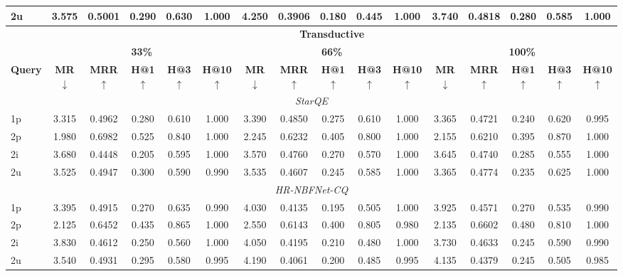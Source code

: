 \documentclass[10pt,journal,compsoc]{IEEEtran}
\begin{document}
\begin{table}[t]
{\begin{tabular}{l ccccc ccccc ccccc}
2u & 3.575 & 0.5001 & 0.290 & 0.630 & 1.000 & 4.250 & 0.3906 & 0.180 & 0.445 & 1.000 & 3.740 & 0.4818 & 0.280 & 0.585 & 1.000 \\
\midrule\midrule
 & \multicolumn{15}{c}{\textbf{Transductive}} \\ \toprule
 & \multicolumn{5}{c}{\textbf{33\%}} & \multicolumn{5}{c}{\textbf{66\%}} & \multicolumn{5}{c}{\textbf{100\%}} \\
\cmidrule(lr){2-6} \cmidrule(lr){7-11} \cmidrule(lr){12-16}
\textbf{Query}
  & \textbf{MR} $\downarrow$& \textbf{MRR} $\uparrow$& \textbf{H@1} $\uparrow$& \textbf{H@3} $\uparrow$& \textbf{H@10} $\uparrow$
  & \textbf{MR} $\downarrow$& \textbf{MRR} $\uparrow$& \textbf{H@1} $\uparrow$& \textbf{H@3} $\uparrow$& \textbf{H@10} $\uparrow$
  & \textbf{MR} $\downarrow$& \textbf{MRR} $\uparrow$& \textbf{H@1} $\uparrow$& \textbf{H@3} $\uparrow$& \textbf{H@10} $\uparrow$\\
\midrule
\multicolumn{16}{c}{\textit{StarQE}} \\
\midrule
1p & 3.315 & 0.4962 & 0.280 & 0.610 & 1.000 & 3.390 & 0.4850 & 0.275 & 0.610 & 1.000 & 3.365 & 0.4721 & 0.240 & 0.620 & 0.995 \\
2p & 1.980 & 0.6982 & 0.525 & 0.840 & 1.000 & 2.245 & 0.6232 & 0.405 & 0.800 & 1.000 & 2.155 & 0.6210 & 0.395 & 0.870 & 1.000 \\
2i & 3.680 & 0.4448 & 0.205 & 0.595 & 1.000 & 3.570 & 0.4760 & 0.270 & 0.570 & 1.000 & 3.645 & 0.4740 & 0.285 & 0.555 & 1.000 \\
2u & 3.525 & 0.4947 & 0.300 & 0.590 & 0.990 & 3.535 & 0.4607 & 0.245 & 0.585 & 1.000 & 3.365 & 0.4774 & 0.235 & 0.625 & 1.000 \\
\midrule
\multicolumn{16}{c}{\textit{HR-NBFNet-CQ}} \\
\midrule
1p & 3.395 & 0.4915 & 0.270 & 0.635 & 0.990 & 4.030 & 0.4135 & 0.195 & 0.505 & 1.000 & 3.925 & 0.4571 & 0.270 & 0.535 & 0.990 \\
2p & 2.125 & 0.6452 & 0.435 & 0.865 & 1.000 & 2.550 & 0.6143 & 0.400 & 0.805 & 0.980 & 2.135 & 0.6602 & 0.480 & 0.810 & 1.000 \\
2i & 3.830 & 0.4612 & 0.250 & 0.560 & 1.000 & 4.050 & 0.4195 & 0.210 & 0.480 & 1.000 & 3.730 & 0.4633 & 0.245 & 0.590 & 0.990 \\
2u & 3.540 & 0.4931 & 0.295 & 0.580 & 0.995 & 4.190 & 0.4061 & 0.200 & 0.485 & 0.995 & 4.135 & 0.4379 & 0.245 & 0.505 & 0.985 \\
\bottomrule
\end{tabular}%
}
\end{table}
\end{document}
